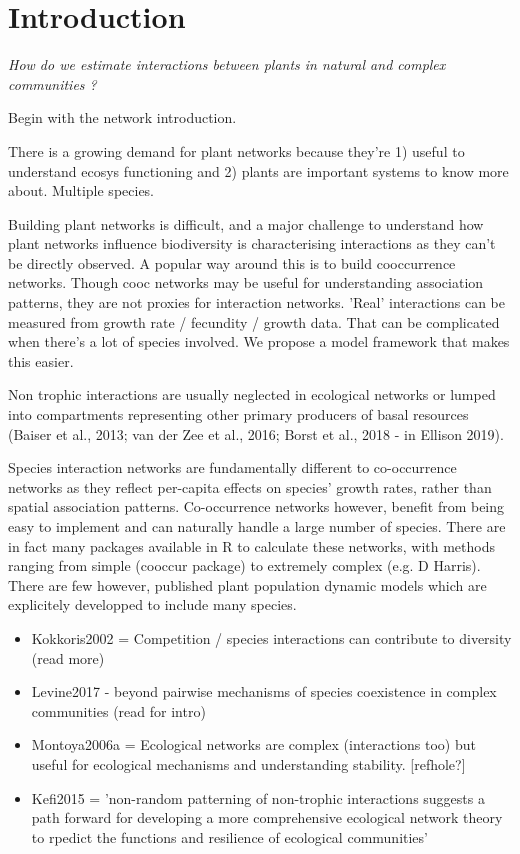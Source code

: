 \documentclass[a4,12pt]{article}
\begin{document}
\section{Introduction}

    \textit{How do we estimate interactions between plants in natural and complex communities ?}

    Begin with the network introduction.

    There is a growing demand for plant networks because they're 1) useful to understand ecosys functioning and 2) plants are important systems to know more about. Multiple species.    

    Building plant networks is difficult, and a major challenge to understand how plant networks influence biodiversity is characterising interactions as they can't be directly observed. A popular way around this is to build cooccurrence networks. Though cooc networks may be useful for understanding association patterns, they are not proxies for interaction networks. 'Real' interactions can be measured from growth rate / fecundity / growth data. That can be complicated when there's a lot of species involved. 
    We propose a model framework that makes this easier.
 
  
    Non trophic interactions are usually neglected in ecological networks or lumped into compartments representing other primary producers of basal resources (Baiser et al., 2013; van der Zee et al., 2016; Borst et al., 2018 - in Ellison 2019).   

    Species interaction networks are fundamentally different to co-occurrence networks as they reflect per-capita effects on species' growth rates, rather than spatial association patterns. 
    Co-occurrence networks however, benefit from being easy to implement and can naturally handle a large number of species. There are in fact many  packages available in R to calculate these networks, with methods ranging from simple (cooccur package) to extremely complex (e.g. D Harris). 
    There are few however, published plant population dynamic models which are explicitely developped to include many species.

    \begin{itemize}
        \item Kokkoris2002 =  Competition / species interactions can contribute to diversity (read more)
        \item Levine2017 - beyond pairwise mechanisms of species coexistence in complex communities (read for intro)
        \item  Montoya2006a = Ecological networks are complex (interactions too) but useful for ecological mechanisms and understanding stability. [refhole?]
        \item Kefi2015 = 'non-random patterning of non-trophic interactions suggests a path forward for developing a more comprehensive ecological network theory to rpedict the functions and resilience of ecological communities'
    \end{itemize}
\end{document}
